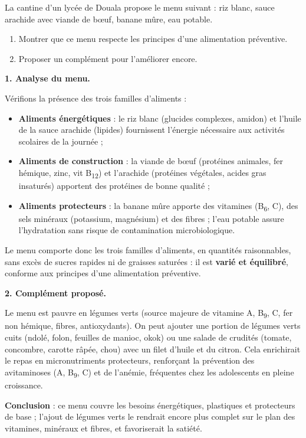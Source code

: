 \documentclass[11pt]{article}
\newcommand{\cle}[1]{{\popxbold\color{popdark}#1}}
\begin{document}
\begin{exoresolu}
La cantine d'un lycée de Douala propose le menu suivant : riz blanc, sauce arachide avec viande de bœuf, banane mûre, eau potable.
\begin{enumerate}
\item Montrer que ce menu respecte les principes d'une alimentation préventive.
\item Proposer un complément pour l'améliorer encore.
\end{enumerate}
\tcblower
\textbf{1. Analyse du menu.}

Vérifions la présence des trois familles d'aliments :
\begin{itemize}
\item \textbf{Aliments énergétiques} : le riz blanc (glucides complexes, amidon) et l'huile de la sauce arachide (lipides) fournissent l'énergie nécessaire aux activités scolaires de la journée ;
\item \textbf{Aliments de construction} : la viande de bœuf (protéines animales, fer hémique, zinc, vit B\textsubscript{12}) et l'arachide (protéines végétales, acides gras insaturés) apportent des \cle{protéines} de bonne qualité ;
\item \textbf{Aliments protecteurs} : la banane mûre apporte des \cle{vitamines} (B\textsubscript{6}, C), des sels minéraux (potassium, magnésium) et des fibres ; l'eau potable assure l'\cle{hydratation} sans risque de contamination microbiologique.
\end{itemize}
Le menu comporte donc les trois familles d'aliments, en quantités raisonnables, sans excès de sucres rapides ni de graisses saturées : il est \textbf{varié et équilibré}, conforme aux principes d'une alimentation préventive.

\textbf{2. Complément proposé.}

Le menu est pauvre en \cle{légumes verts} (source majeure de vitamine A, B\textsubscript{9}, C, fer non hémique, fibres, antioxydants). On peut ajouter une portion de légumes verts cuits (ndolé, folon, feuilles de manioc, okok) ou une salade de crudités (tomate, concombre, carotte râpée, chou) avec un filet d'huile et du citron. Cela enrichirait le repas en micronutriments protecteurs, renforçant la prévention des avitaminoses (A, B\textsubscript{9}, C) et de l'anémie, fréquentes chez les adolescents en pleine croissance.

\textbf{Conclusion} : ce menu couvre les besoins énergétiques, plastiques et protecteurs de base ; l'ajout de légumes verts le rendrait encore plus complet sur le plan des vitamines, minéraux et fibres, et favoriserait la satiété.
\end{exoresolu}
\end{document}
